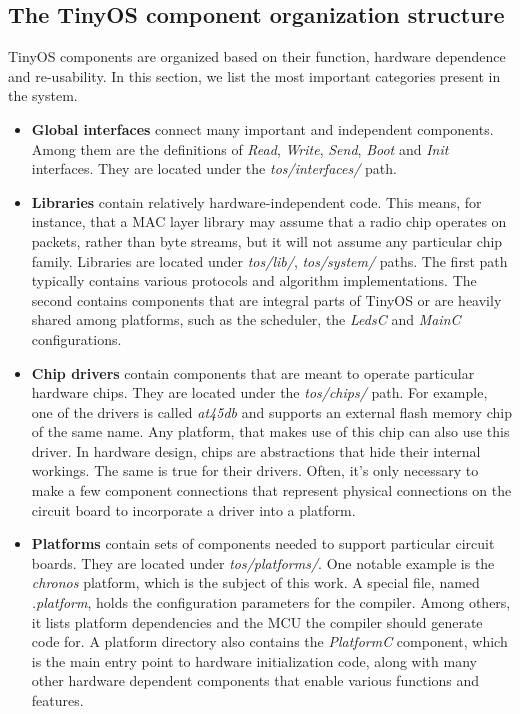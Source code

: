 \subsection{The TinyOS component organization structure}

TinyOS components are organized based on their function, hardware
dependence and re-usability. In this section, we list the most
important categories present in the system.

\begin{itemize}
  \item {\bf Global interfaces} connect many important and independent components. Among them are the definitions of \emph{Read}, \emph{Write}, \emph{Send}, \emph{Boot} and \emph{Init} interfaces. They are located under the \emph{tos/interfaces/} path.

  \item {\bf Libraries} contain relatively hardware-independent code.  This means, for instance, that a MAC layer library may assume that a radio chip operates on packets, rather than byte streams, but it will not assume any particular chip family. Libraries are located under \emph{tos/lib/}, \emph{tos/system/} paths. The first path typically contains various protocols and algorithm implementations. The second contains components that are integral parts of TinyOS or are heavily shared among platforms, such as the scheduler, the \emph{LedsC} and \emph{MainC} configurations.

  \item {\bf Chip drivers} contain components that are meant to operate particular hardware chips. They are located under the \emph{tos/chips/} path. For example, one of the drivers is called \emph{at45db} and supports an external flash memory chip of the same name. Any platform, that makes use of this chip can also use this driver. In hardware design, chips are abstractions that hide their internal workings. The same is true for their drivers. Often, it's only necessary to make a few component connections that represent physical connections on the circuit board to incorporate a driver into a platform.

  \item {\bf Platforms} contain sets of components needed to support particular circuit boards. They are located under \emph{tos/platforms/}. One notable example is the \emph{chronos} platform, which is the subject of this work. A special file, named \emph{.platform}, holds the configuration parameters for the compiler. Among others, it lists platform dependencies and the MCU the compiler should generate code for. A platform directory  also contains the \emph{PlatformC} component, which is the main entry point to hardware initialization code, along with many other hardware dependent components that enable various functions and features.


\end{itemize}

